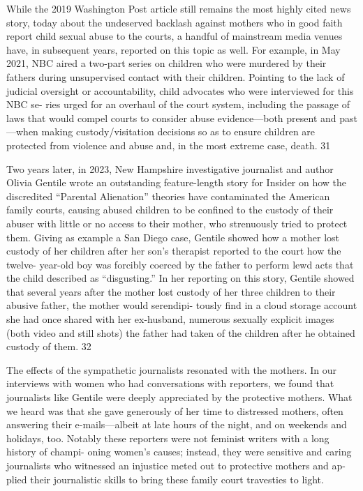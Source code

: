 While the 2019 Washington Post article still remains the most highly
cited news story, today about the undeserved backlash against mothers
who in good faith report child sexual abuse to the courts, a handful of
mainstream media venues have, in subsequent years, reported on this
topic as well. For example, in May 2021, NBC aired a two-part series
on children who were murdered by their fathers during unsupervised
contact with their children. Pointing to the lack of judicial oversight or
accountability, child advocates who were interviewed for this NBC se-
ries urged for an overhaul of the court system, including the passage
of laws that would compel courts to consider abuse evidence—both
present and past—when making custody/visitation decisions so as to
ensure children are protected from violence and abuse and, in the most
extreme case, death. 31 \pfl{}


Two years later, in 2023, New Hampshire investigative journalist
and author Olivia Gentile wrote an outstanding feature-length story
for Insider on how the discredited “Parental Alienation” theories have
contaminated the American family courts, causing abused children to
be confined to the custody of their abuser with little or no access to
their mother, who strenuously tried to protect them. Giving as example
a San Diego case, Gentile showed how a mother lost custody of her
children after her son’s therapist reported to the court how the twelve-
year-old boy was forcibly coerced by the father to perform lewd acts
that the child described as “disgusting.” In her reporting on this story,
Gentile showed that several years after the mother lost custody of her
three children to their abusive father, the mother would serendipi-
tously find in a cloud storage account she had once shared with her
ex-husband, numerous sexually explicit images (both video and still
shots) the father had taken of the children after he obtained custody of
them. 32 \pfl{}


The effects of the sympathetic journalists resonated with the mothers.
In our interviews with women who had conversations with reporters,
we found that journalists like Gentile were deeply appreciated by the
protective mothers. What we heard was that she gave generously of
her time to distressed mothers, often answering their e-mails—albeit
at late hours of the night, and on weekends and holidays, too. Notably
these reporters were not feminist writers with a long history of champi-
oning women’s causes; instead, they were sensitive and caring journalists
who witnessed an injustice meted out to protective mothers and ap-
plied their journalistic skills to bring these family court travesties to
light. \pfl{}


